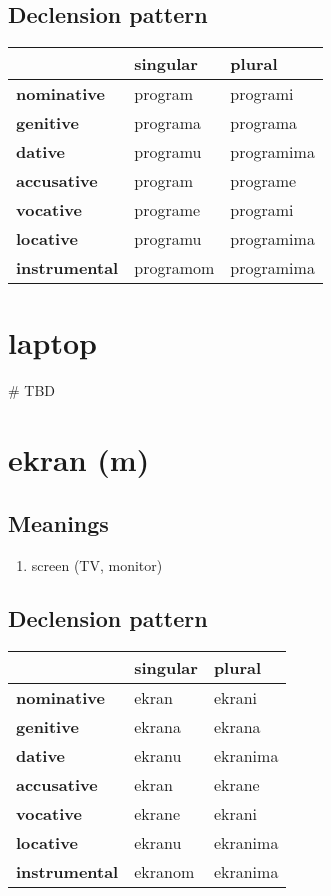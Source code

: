 \subsection*{Declension pattern}
\begin{tabularx}{\linewidth}{Xll}
\toprule
{} &   singular &      plural \\
\midrule
\textbf{nominative  } &    program &    programi \\
\textbf{genitive    } &   programa &    programa \\
\textbf{dative      } &   programu &  programima \\
\textbf{accusative  } &    program &    programe \\
\textbf{vocative    } &   programe &    programi \\
\textbf{locative    } &   programu &  programima \\
\textbf{instrumental} &  programom &  programima \\
\bottomrule
\end{tabularx}

\filbreak
\section{laptop}
{\# TBD}
\section{ekran (m)}
\subsection*{Meanings}
\begin{enumerate}
\item screen (TV, monitor)
\end{enumerate}
\subsection*{Declension pattern}
\begin{tabularx}{\linewidth}{Xll}
\toprule
{} & singular &    plural \\
\midrule
\textbf{nominative  } &    ekran &    ekrani \\
\textbf{genitive    } &   ekrana &    ekrana \\
\textbf{dative      } &   ekranu &  ekranima \\
\textbf{accusative  } &    ekran &    ekrane \\
\textbf{vocative    } &   ekrane &    ekrani \\
\textbf{locative    } &   ekranu &  ekranima \\
\textbf{instrumental} &  ekranom &  ekranima \\
\bottomrule
\end{tabularx}

